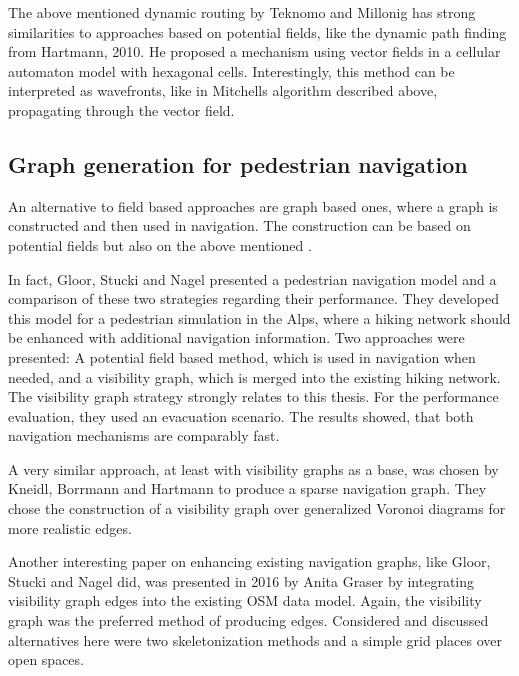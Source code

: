 		The above mentioned dynamic routing by Teknomo and Millonig has strong similarities to approaches based on potential fields, like the dynamic path finding from Hartmann, 2010\cite{hartmann-geodesic}.
		He proposed a mechanism using vector fields in a cellular automaton model with hexagonal cells.
		Interestingly, this method can be interpreted as wavefronts, like in Mitchells algorithm described above, propagating through the vector field\cite[4]{hartmann-geodesic}.
			
	
	\subsection{Graph generation for pedestrian navigation}
	
		An alternative to field based approaches are graph based ones, where a graph is constructed and then used in navigation.
		The construction can be based on potential fields but also on the above mentioned .
		
		In fact, Gloor, Stucki and Nagel presented a pedestrian navigation model and a comparison of these two strategies regarding their performance\cite{gloor-hybrid-pedestrian-routing}.
		They developed this model for a pedestrian simulation in the Alps, where a hiking network should be enhanced with additional navigation information.
		Two approaches were presented: A potential field based method, which is used in navigation when needed, and a visibility graph, which is merged into the existing hiking network.
		The visibility graph strategy strongly relates to this thesis.
		For the performance evaluation, they used an evacuation scenario.
		The results showed, that both navigation mechanisms are comparably fast.
		
		A very similar approach, at least with visibility graphs as a base, was chosen by Kneidl, Borrmann and Hartmann to produce a sparse navigation graph\cite[5]{kneidl-borrmann-hartmann-navigation}.
		They chose the construction of a visibility graph over generalized Voronoi diagrams for more realistic edges.
		
		Another interesting paper on enhancing existing navigation graphs, like Gloor, Stucki and Nagel did, was presented in 2016 by Anita Graser by integrating visibility graph edges into the existing OSM data model\cite{graser-osm-open-spaces}.
		Again, the visibility graph was the preferred method of producing edges.
		Considered and discussed alternatives here were two skeletonization methods and a simple grid places over open spaces.